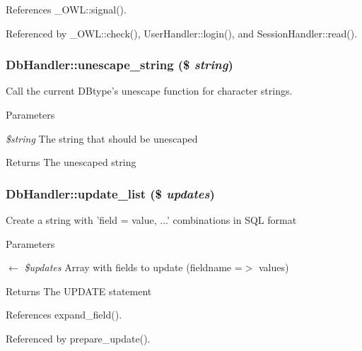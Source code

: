 References \_\-OWL::signal().



Referenced by \_\-OWL::check(), UserHandler::login(), and SessionHandler::read().

\subsubsection[{unescape\_\-string}]{\setlength{\rightskip}{0pt plus 5cm}DbHandler::unescape\_\-string (\$ {\em string})}\label{classDbHandler_a27c604b14c39913d34630e5504979b15}
Call the current DBtype's unescape function for character strings.


\begin{DoxyParams}{Parameters}
\item[{\em \$string}]The string that should be unescaped \end{DoxyParams}
\begin{DoxyReturn}{Returns}
The unescaped string 
\end{DoxyReturn}
\subsubsection[{update\_\-list}]{\setlength{\rightskip}{0pt plus 5cm}DbHandler::update\_\-list (\$ {\em updates})}\label{classDbHandler_aa734a4d3767057b811be5b4621d55cdd}
Create a string with 'field = value, ...' combinations in SQL format


\begin{DoxyParams}{Parameters}
\item[\mbox{$\leftarrow$} {\em \$updates}]Array with fields to update (fieldname =$>$ values) \end{DoxyParams}
\begin{DoxyReturn}{Returns}
The UPDATE statement 
\end{DoxyReturn}


References expand\_\-field().



Referenced by prepare\_\-update().

